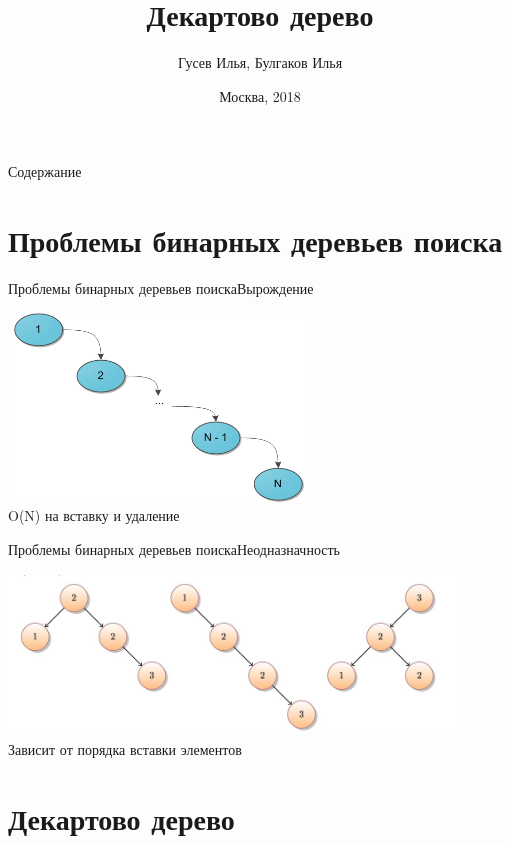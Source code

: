 \documentclass[10pt]{beamer}
\title[\href{https://goo.gl/NRgp8K}{https://goo.gl/NRgp8K} (Term 1)]{Декартово дерево}
\author[Гусев Илья, Булгаков Илья]{Гусев Илья, Булгаков Илья}
\institute[МФТИ] 
{Московский физико-технический институт\\*}
\date{Москва, 2018}
\begin{document}
\begin{frame}
  \titlepage
\end{frame}

\begin{frame}{Содержание}
\tableofcontents
\end{frame}

\section{Проблемы бинарных деревьев поиска}
\begin{frame}[fragile]{Проблемы бинарных деревьев поиска}{Вырождение}
\begin{center}
    \includegraphics[width=8cm, height=5cm]{Term_1/Source/Pirctures/tree_problem.png}\\
    O(N) на вставку и удаление
\end{center}
\end{frame}

\begin{frame}[fragile]{Проблемы бинарных деревьев поиска}{Неодназначность}
\begin{center}
\includegraphics[width=12cm, height=4.3cm]{Term_1/Source/Pirctures/tree_ways.jpg}
\\
Зависит от порядка вставки элементов
\end{center}
\end{frame}

\section{Декартово дерево}
\end{document}
